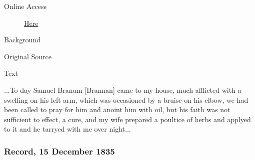 			\begin{description}
				\item[Online Access] \href{https://www.josephsmithpapers.org/paper-summary/journal-1835-1836/67}{Here}
			\end{description}
			
			\begin{description}
				\item[Background]
			\end{description}
			
			
			\begin{description}
				\item[Original Source]
			\end{description}
			
			
			\begin{description}
				\item[Text]
			\end{description}
			
				...To day Samuel Branum [Brannan] came to my house, much afflicted with a swelling on his left arm, which was occasioned by a bruise on his elbow, we had been called to pray for him and anoint him with oil, but his faith was not sufficient to effect, a cure, and my wife prepared a poultice of herbs and applyed to it and he tarryed with me over night...
				
		\subsubsection{Record, 15 December 1835}
			\label{EMS-1835-JS-15-DEC-1835}
			
